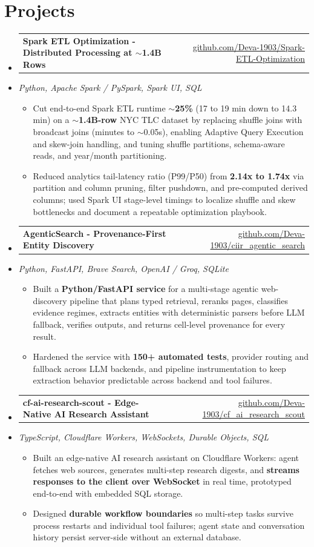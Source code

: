 \documentclass[letterpaper,10pt]{article}
\makeatletter
\newcommand{\resumeItem}[1]{
  \item\small{#1\vspace{-1pt}}
}
\newcommand{\resumeProjectHeading}[2]{
    \item
    \begin{tabular*}{0.985\textwidth}[t]{l@{\extracolsep{\fill}}r}
      \small\textbf{#1} & \small #2 \\
    \end{tabular*}\vspace{-5pt}
}
\newcommand{\resumeProjectSubheading}[1]{
  \vspace{-2pt}\item[] {\small\textcolor{ResumeSlate}{\emph{#1}}}\vspace{-3pt}
}
\newcommand{\resumeSubHeadingListStart}{\begin{itemize}[leftmargin=0.0in, label={}, itemsep=2pt, topsep=2pt]}
\newcommand{\resumeSubHeadingListEnd}{\end{itemize}}
\newcommand{\resumeItemListStart}{\begin{itemize}[leftmargin=0.18in, itemsep=2pt, topsep=1pt]}
\newcommand{\resumeItemListEnd}{\end{itemize}\vspace{-4pt}}
\makeatother
\begin{document}
\section{Projects}
\resumeSubHeadingListStart
  \resumeProjectHeading
    {Spark ETL Optimization - Distributed Processing at \(\sim\)1.4B Rows}
    {\href{https://github.com/Deva-1903/Spark-ETL-Optimization}{github.com/Deva-1903/Spark-ETL-Optimization}}
  \resumeProjectSubheading{Python, Apache Spark / PySpark, Spark UI, SQL}
    \resumeItemListStart
      \resumeItem{Cut end-to-end Spark ETL runtime \textbf{$\sim$25\%} (17 to 19 min down to 14.3 min) on a \textbf{$\sim$1.4B-row} NYC TLC dataset by replacing shuffle joins with broadcast joins (minutes to $\sim$0.05s), enabling Adaptive Query Execution and skew-join handling, and tuning shuffle partitions, schema-aware reads, and year/month partitioning.}
      \resumeItem{Reduced analytics tail-latency ratio (P99/P50) from \textbf{2.14x to 1.74x} via partition and column pruning, filter pushdown, and pre-computed derived columns; used Spark UI stage-level timings to localize shuffle and skew bottlenecks and document a repeatable optimization playbook.}
    \resumeItemListEnd
  \resumeProjectHeading
    {AgenticSearch - Provenance-First Entity Discovery}
    {\href{https://github.com/Deva-1903/ciir_agentic_search}{github.com/Deva-1903/ciir\_agentic\_search}}
  \resumeProjectSubheading{Python, FastAPI, Brave Search, OpenAI / Groq, SQLite}
    \resumeItemListStart
      \resumeItem{Built a \textbf{Python/FastAPI service} for a multi-stage agentic web-discovery pipeline that plans typed retrieval, reranks pages, classifies evidence regimes, extracts entities with deterministic parsers before LLM fallback, verifies outputs, and returns cell-level provenance for every result.}
      \resumeItem{Hardened the service with \textbf{150+ automated tests}, provider routing and fallback across LLM backends, and pipeline instrumentation to keep extraction behavior predictable across backend and tool failures.}
    \resumeItemListEnd
  \resumeProjectHeading
    {cf-ai-research-scout - Edge-Native AI Research Assistant}
    {\href{https://github.com/Deva-1903/cf_ai_research_scout}{github.com/Deva-1903/cf\_ai\_research\_scout}}
  \resumeProjectSubheading{TypeScript, Cloudflare Workers, WebSockets, Durable Objects, SQL}
    \resumeItemListStart
      \resumeItem{Built an edge-native AI research assistant on Cloudflare Workers: agent fetches web sources, generates multi-step research digests, and \textbf{streams responses to the client over WebSocket} in real time, prototyped end-to-end with embedded SQL storage.}
      \resumeItem{Designed \textbf{durable workflow boundaries} so multi-step tasks survive process restarts and individual tool failures; agent state and conversation history persist server-side without an external database.}
    \resumeItemListEnd
\resumeSubHeadingListEnd
\vspace{-4pt}
\end{document}
